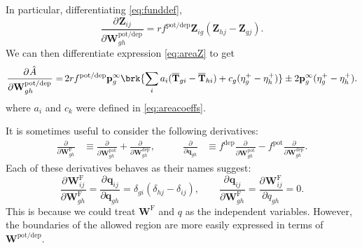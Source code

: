 \documentclass[9pt,twocolumn,twoside,lineno]{pnas-new}
\newcommand{\pdiff}[3][]{\frac{\partial^{#1} #2}{\partial {#3}^{#1}}}
\newcommand{\prob}{\mathbf{p}}
\newcommand{\eq}{\prob^\infty}
\newcommand{\fpt}{\mathbf{T}}
\newcommand{\fptb}{\overline{\fpt}}
\newcommand{\fund}{\mathbf{Z}}
\newcommand{\pib}{\boldsymbol{\pi}}
\newcommand{\w}{\mathbf{w}}
\newcommand{\W}{\mathbf{W}}
\newcommand{\enc}{\mathbf{q}}
\newcommand{\frg}{\W^{\mathrm{F}}}
\newcommand{\pot}{^{\text{pot}}}
\newcommand{\dep}{^{\text{dep}}}
\newcommand{\potdep}{^{\text{pot/dep}}}
\begin{document}
\begin{strip}
In particular, differentiating \cref{eq:funddef},
%
\begin{equation}\label{eq:derivZ}
  \pdiff{\fund_{ij}}{\W\potdep _{gh}} = rf\potdep  \fund_{ig} (\fund_{hj}-\fund_{gj}).
\end{equation}
%
We can then differentiate expression \cref{eq:areaZ} to get
%
\begin{equation}\label{eq:derivA}
  \begin{aligned}
    \pdiff{\hat{A}}{\W\potdep _{gh}} =&\,
      2rf\potdep  \eq_g \brk{\sum_i a_i (\fptb_{gi}-\fptb_{hi}) + c_g (\eta^+_{g}-\eta^+_{h})}
      \pm 2 \eq_g (\eta^+_g - \eta^+_h). \\
  \end{aligned}
\end{equation}
%
where $a_i$ and $c_k$ were defined in \cref{eq:areacoeffs}.

It is sometimes useful to consider the following derivatives:
%
\begin{equation}\label{eq:derivqw}
  \begin{aligned}
    \pdiff{}{\frg_{gh}} &\equiv     \pdiff{}{\W\pot _{gh}} +     \pdiff{}{\W\dep _{gh}} ,&\qquad
    \pdiff{}{\enc_{gh}}    &\equiv f\dep  \pdiff{}{\W\pot _{gh}} - f\pot  \pdiff{}{\W\dep _{gh}} .
  \end{aligned}
\end{equation}
%
Each of these derivatives behaves as their names suggest:
%
\begin{equation}\label{eq:derivqweff}
  \pdiff{\frg_{ij}}{\frg_{gh}} = \pdiff{\enc_{ij}}{\enc_{gh}}
  =  \delta_{gi}(\delta_{hj}-\delta_{ij}),
  \qquad
  \pdiff{\enc_{ij}}{\frg_{gh}} = \pdiff{\frg_{ij}}{q_{gh}}  = 0.
\end{equation}
%
This is because we could treat $\frg$ and $q$ as the independent variables. However, the boundaries of the allowed region are more easily expressed in terms of $\W\potdep $.



\end{strip}
\end{document}
